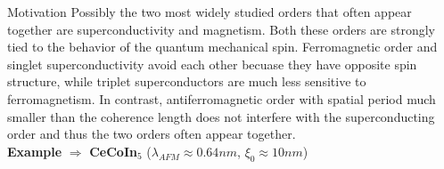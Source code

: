 \documentclass{beamer} %
\begin{document}
\begin{frame}{}
\vspace{2cm}
    \begin{columns}[t]
    	\begin{column}{.4\textwidth}
    		\begin{block}{\centering\Huge Motivation}
Possibly the two most widely studied orders that often appear together are superconductivity and magnetism. Both these orders are strongly tied to the behavior of the quantum mechanical spin. Ferromagnetic order and singlet superconductivity avoid each other becuase they have opposite spin structure, while triplet superconductors are much less sensitive to ferromagnetism. In contrast, antiferromagnetic order with spatial period much smaller than the coherence length does not interfere with the superconducting order and thus the two orders often appear together. \\
\vspace{0.9cm}
{\bf Example }$\Rightarrow$ {\bf CeCoIn$_5$} ($\lambda_{AFM} \approx 0.64 nm$, $\xi_0\approx 10nm$)


\end{block}
\end{column}
\end{columns}
\end{frame}
\end{document}
